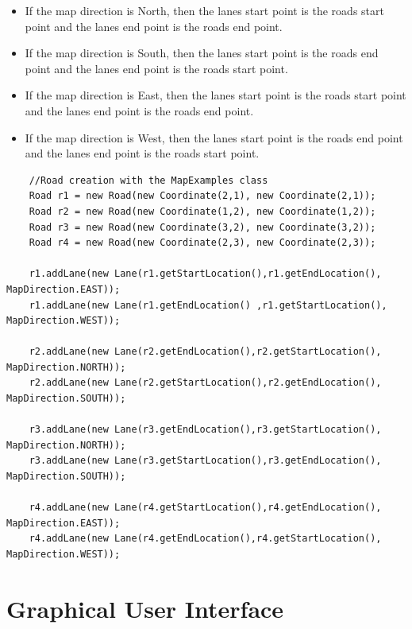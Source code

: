 \documentclass[a4paper]{article}
\begin{document}
\begin{itemize}
\item If the map direction is North, then the lane\textsc{}s start point is the road\textsc{}s start point and the lane\textsc{}s end point is the road\textsc{}s end point.
\item If the map direction is South, then the lane\textsc{}s start point is the road\textsc{}s end point and the lane\textsc{}s end point is the road\textsc{}s start point.
\item If the map direction is East,  then the lane\textsc{}s start point is the road\textsc{}s start point and the lane\textsc{}s end point is the road\textsc{}s end point.
\item If the map direction is West,  then the lane\textsc{}s start point is the road\textsc{}s end point and the lane\textsc{}s end point is the road\textsc{}s start point.
\end{itemize}

\begin{lstlisting}
	//Road creation with the MapExamples class
	Road r1 = new Road(new Coordinate(2,1), new Coordinate(2,1));
	Road r2 = new Road(new Coordinate(1,2), new Coordinate(1,2));
	Road r3 = new Road(new Coordinate(3,2), new Coordinate(3,2));
	Road r4 = new Road(new Coordinate(2,3), new Coordinate(2,3));
	
	r1.addLane(new Lane(r1.getStartLocation(),r1.getEndLocation(), MapDirection.EAST));
	r1.addLane(new Lane(r1.getEndLocation() ,r1.getStartLocation(), MapDirection.WEST));
	
	r2.addLane(new Lane(r2.getEndLocation(),r2.getStartLocation(), MapDirection.NORTH));
	r2.addLane(new Lane(r2.getStartLocation(),r2.getEndLocation(), MapDirection.SOUTH));
	
	r3.addLane(new Lane(r3.getEndLocation(),r3.getStartLocation(), MapDirection.NORTH));
	r3.addLane(new Lane(r3.getStartLocation(),r3.getEndLocation(), MapDirection.SOUTH));
	
	r4.addLane(new Lane(r4.getStartLocation(),r4.getEndLocation(), MapDirection.EAST));
	r4.addLane(new Lane(r4.getEndLocation(),r4.getStartLocation(), MapDirection.WEST));
\end{lstlisting}

\section{Graphical User Interface}
\end{document}
